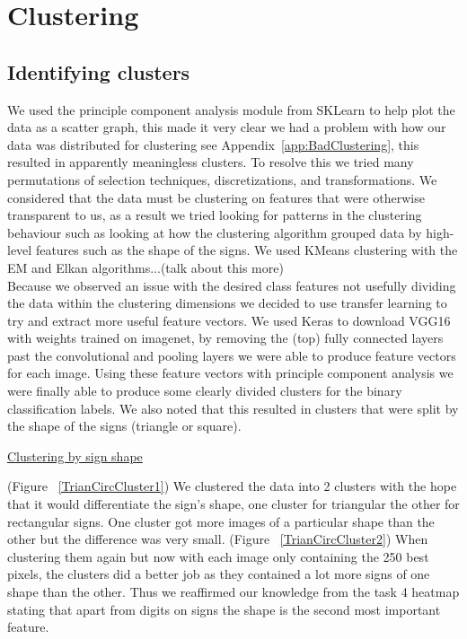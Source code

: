 \documentclass[11pt]{article}
\begin{document}
\pagebreak

\section{Clustering}
\subsection{Identifying clusters}
We used the principle component analysis module from SKLearn to help plot the data as a scatter graph, this made it very clear we had a problem with how our data was distributed for clustering see Appendix~\ref{app:BadClustering}, this resulted in apparently meaningless clusters.
To resolve this we tried many permutations of selection techniques, discretizations, and transformations. 
We considered that the data must be clustering on features that were otherwise transparent to us, as a result we tried looking for patterns in the clustering behaviour such as looking at how the clustering algorithm grouped data by high-level features such as the shape of the signs.
We used KMeans clustering with the EM and Elkan algorithms...({\huge talk about this more})\\
Because we observed an issue with the desired class features not usefully dividing the data within the clustering dimensions we decided to use transfer learning to try and extract more useful feature vectors.
We used Keras to download VGG16 with weights trained on imagenet, by removing the (top) fully connected layers past the convolutional and pooling layers we were able to produce feature vectors for each image. Using these feature vectors with principle component analysis we were finally able to produce some clearly divided clusters for the binary classification labels. 
We also noted that this resulted in clusters that were split by the shape of the signs (triangle or square).   

\underline{Clustering by sign shape}
\par
(Figure ~\ref{TrianCircCluster1}) We clustered the data into 2 clusters with the hope that it would differentiate the sign's shape, one cluster for triangular the other for rectangular signs. One cluster got more images of a particular shape than the other but the difference was very small. 
(Figure ~\ref{TrianCircCluster2}) When clustering them again but now with each image only containing the 250 best pixels, the clusters did a better job as they contained a lot more signs of one shape than the other. Thus we reaffirmed our knowledge from the task 4 heatmap stating that apart from digits on signs the shape is the second most important feature. 
\end{document}
